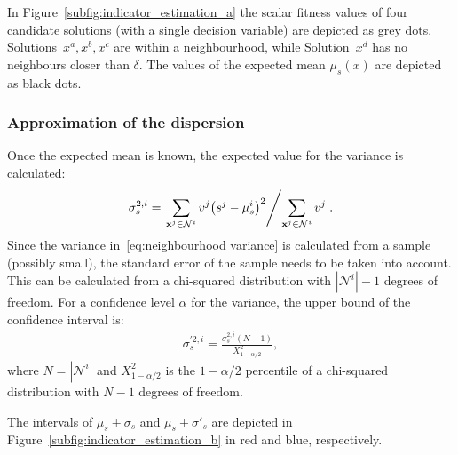 \documentclass[a4paper]{article}
\newcommand{\brr}[1]{{\left({#1}\right)}} %
\newcommand{\brabs}[1]{\left\vert{#1}\right\vert} %
\newcommand{\vx}{\ensuremath{\mathbf{x}}} %
\newcommand{\NSet}{\ensuremath{\mathcal{N}}} %
\begin{document}
In Figure~\ref{subfig:indicator_estimation_a} the scalar fitness values of four candidate solutions (with a single decision variable) are depicted as grey dots. Solutions~$x^a,x^b,x^c$ are within a neighbourhood, while Solution~$x^d$ has no neighbours closer than $\delta$. The values of the expected mean $\mu_s\brr{x}$ are depicted as black dots.

\subsubsection{Approximation of the dispersion}
\label{subsubsec:appx dispersion}
Once the expected mean is known, the expected value for the variance is calculated:
\begin{align}
	\label{eq:neighbourhood variance}	\sigma^{2,i}_s = \left. \sum_{\vx^j\in\NSet^i} v^j \brr{s^j - \mu^i_s}^2 \middle/ \sum_{\vx^j\in\NSet^i} v^j \right. .
\end{align}
Since the variance in~\eqref{eq:neighbourhood variance} is calculated from a sample (possibly small), the standard error of the sample needs to be taken into account. This can be calculated from a chi-squared distribution with $\brabs{\NSet^i}-1$ degrees of freedom. For a confidence level $\alpha$ for the variance, the upper bound of the confidence interval is:
\begin{align}
	\label{eq:variance upper bound} \sigma^{\prime 2,i}_s = \frac{\sigma^{2,i}_s\brr{N-1}} {X^2_{1-\alpha/2}},
\end{align}
where $N=\brabs{\NSet^i}$ and $X^2_{1-\alpha/2}$ is the $1-\alpha/2$ percentile of a chi-squared distribution with $N-1$ degrees of freedom.

The intervals of $\mu_s\pm\sigma_s$ and $\mu_s\pm\sigma'_s$ are depicted in Figure~\ref{subfig:indicator_estimation_b} in red and blue, respectively.
\end{document}

